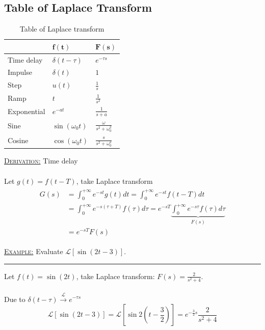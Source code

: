\documentclass[12pt,a4paper]{article}
\begin{document}
\subsection{Table of Laplace Transform} 
\begin{table}[H]\centering
\caption{Table of Laplace transform}
\begin{tabular}{p{3cm}|p{3cm}|p{3cm}}
\hline
& $\boldsymbol{f(t)}$ & $\boldsymbol{F(s)}$\\ \hline
Time delay & $ \delta(t-\tau)$ &\Large$e^{-\tau s}$ \\ [1.5ex] \hline
Impulse & $\delta(t)$  & $1$ \\ [1.5ex] \hline
Step& $u(t)$ &  \Large$\frac{1}{s}$  \\  [1.5ex] \hline
Ramp&  $t$ & \Large$\frac{1}{s^{2}}$  \\ [1.5ex]  \hline
Exponential& $e^{-at}$ & \Large$\frac{1}{s+a}$  \\ [1.5ex] \hline
Sine& $\sin(\omega_{0} t)$ & \Large$\frac{\omega}{s^{2}+\omega_{0}^{2}}$\\ [1.6ex] \hline
Cosine& $\cos(\omega_{0} t)$ & \Large$\frac{s}{s^{2}+\omega_{0}^{2}}$ \\ [1.6ex] \hline
\end{tabular}
\end{table}

\begin{tcolorbox}[breakable]
\underline{\textsc{Derivation:}} Time delay\\\\
Let $g(t)=f(t-T)$, take Laplace transform
\begin{align*}
\begin{split}
G(s) &= \int_{0}^{+\infty}e^{-st}g(t)dt =  \int_{0}^{+\infty}e^{-st}f(t-T)dt\\
&= \int_{0}^{+\infty}e^{-s(\tau+T)}f(\tau)d\tau = e^{-sT}\underbrace{\int_{0}^{+\infty}e^{-s\tau}f(\tau)d\tau}_{F(s)} \\
&= e^{-sT}F(s)
\end{split}
\end{align*}
\end{tcolorbox}

\begin{tcolorbox}[breakable]%
\underline{\textsc{Example:}} Evaluate $\mathcal{L}[\sin(2t-3)]$.
\vspace{.3cm} \hrule \vspace{.3cm} 
Let $f(t) = \sin(2t)$, take Laplace transform: $F(s) = \frac{2}{s^{2}+4}$.\\\\
Due to $\delta(t-\tau)  \xrightarrow{\mathcal{L}} e^{-\tau s}$
\[\mathcal{L}[\sin(2t-3)] = \mathcal{L}[\sin2(t-\frac{3}{2})] = e^{-\frac{3}{2}s}\frac{2}{s^{2}+4}\]
\end{tcolorbox}
\end{document}
